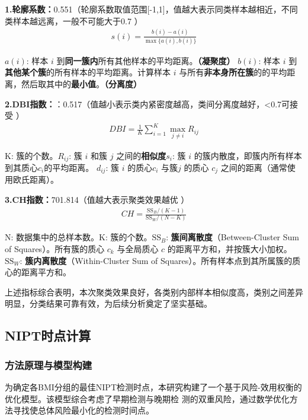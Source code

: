 \documentclass{article}
\begin{document}
\textbf{1.轮廓系数：}0.551（轮廓系数取值范围[-1,1]，值越大表示同类样本越相近，不同类样本越远离，一般不可能大于0.7 ）
\begin{gather}
    s(i)=\frac{b(i)-a(i)}{\max{\{a(i),b(i)\}}} \tag{4}
\end{gather}

\( a(i) \): 样本 \( i \) 到\textbf{同一簇内}所有其他样本的平均距离。\textbf{（凝聚度）}
\textbf{\( b(i) \)}: 样本 \( i \) 到\textbf{其他某个簇}的所有样本的平均距离。计算样本 \( i \)
与所有\textbf{非本身所在簇}的的平均距离，然后取其中的\textbf{最小值}。\textbf{（分离度）}

\textbf{2.DBI指数：}：0.517（值越小表示类内紧密度越高，类间分离度越好，<0.7可接受 ）
\begin{gather}
    DBI = \frac{1}{K} \sum_{i=1}^{K} \max_{j \neq i} R_{ij} \tag{5}
\end{gather}

K: 簇的个数。$R_{ij}$: 簇 $i$ 和簇 $j$ 之间的\textbf{相似度}$s_i$: 簇 $i$ 的簇内散度，即簇内所有样本到其质心$c_i$的平均距离。
$d_{ij}$: 簇 $i$ 的质心$ c_i$ 与簇$j$ 的质心 $c_j$ 之间的距离（通常使用欧氏距离）。

\textbf{3.CH指数：}701.814（值越大表示聚类效果越优 ）
\begin{gather}
    CH = \frac{\text{SS}_B / (K - 1)}{\text{SS}_W / (N - K)} \tag{6}
\end{gather}

N: 数据集中的总样本数。K: 簇的个数。$\text{SS}_B$: \textbf{簇间离散度}（Between-Cluster Sum
of Squares）。所有簇的质心 $c_k$ 与全局质心 $c$ 的距离平方和，并按簇大小加权。
$\text{SS}_W$: \textbf{簇内离散度}（Within-Cluster Sum of Squares）。所有样本点到其所属簇的质心的距离平方和。

上述指标综合表明，本次聚类效果良好，各类别内部样本相似度高，类别之间差异明显，分类结果可靠有效，为后续分析奠定了坚实基础。
\subsection{\textbf{NIPT时点计算}}
\subsubsection{\textbf{方法原理与模型构建}}
为确定各BMI分组的最佳NIPT检测时点，本研究构建了一个基于风险-效用权衡的优化模型。该模型综合考虑了早期检测与晚期检
测的双重风险，通过数学优化方法寻找使总体风险最小化的检测时间点。
\end{document}
